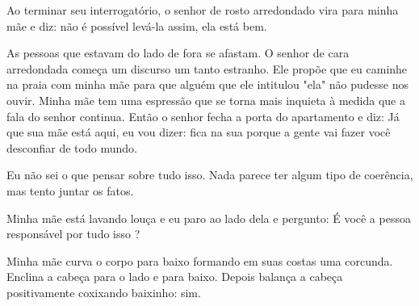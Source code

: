 \documentclass[11pt]{book}
\begin{document}
Ao terminar seu interrogatório, o senhor de rosto arredondado vira para minha mãe e diz: não é possível levá-la assim, ela está bem.

As pessoas que estavam do lado de fora se afastam. O senhor de cara arredondada começa um discurso um tanto estranho. Ele propõe que eu caminhe na praia com minha mãe para que alguém que ele intitulou "ela" não pudesse nos ouvir. Minha mãe tem uma espressão que se torna mais inquieta à medida que a fala do senhor continua. Então o senhor fecha a porta do apartamento e diz: Já que sua mãe está aqui, eu vou dizer: fica na sua porque a gente vai fazer você desconfiar de todo mundo. 

Eu não sei o que pensar sobre tudo isso. Nada parece ter algum tipo de coerência, mas tento juntar os fatos.

Minha mãe está lavando louça e eu paro ao lado dela e pergunto: É você a pessoa responsável por tudo isso ? 

Minha mãe curva o corpo para baixo formando em suas costas uma corcunda. Enclina a cabeça para o lado e para baixo. Depois balança a cabeça positivamente coxixando baixinho: sim.
\end{document}
